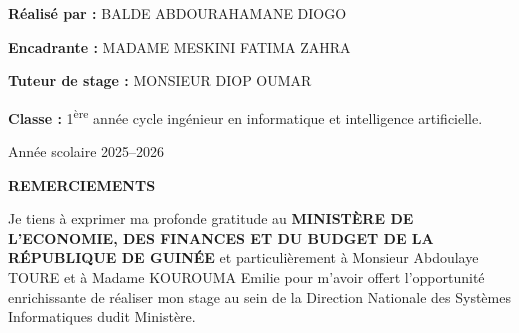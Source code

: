 \documentclass[12pt,a4paper]{article}
\begin{document}
\begin{center}


\vspace{2cm}

\end{center}


\begin{flushleft}

\textbf{Réalisé par :} BALDE ABDOURAHAMANE DIOGO

\vspace{0.4cm}

\textbf{Encadrante :} MADAME MESKINI FATIMA ZAHRA

\vspace{0.4cm}

\textbf{Tuteur de stage :} MONSIEUR DIOP OUMAR
\vspace{0.4cm}

\textbf{Classe :} 1\textsuperscript{ère} année cycle ingénieur en informatique et intelligence artificielle.

\end{flushleft}


\vfill


\begin{flushleft}
Année scolaire 2025--2026
\end{flushleft}


\newpage

\begin{center}
{\Large\bfseries REMERCIEMENTS}
\end{center}

\vspace{1cm}

Je tiens à exprimer ma profonde gratitude au \textbf{MINISTÈRE DE L’ECONOMIE, DES FINANCES ET DU BUDGET DE LA RÉPUBLIQUE DE GUINÉE} et particulièrement à Monsieur Abdoulaye TOURE et à Madame KOUROUMA Emilie pour m'avoir offert l'opportunité enrichissante de réaliser mon stage au sein de la Direction Nationale des Systèmes Informatiques dudit Ministère.
\end{document}
